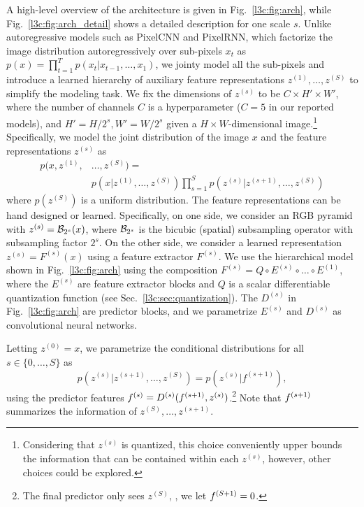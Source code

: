A high-level overview of the architecture is given in Fig.~\ref{l3c:fig:arch}, while Fig.~\ref{l3c:fig:arch_detail} shows a detailed description for one scale $s$.
Unlike autoregressive models such as PixelCNN and PixelRNN, which factorize the image distribution autoregressively over sub-pixels $x_t$ as $p(x) = \prod_{t=1}^T p(x_t|x_{t-1}, \ldots, x_1)$, we jointy model all the sub-pixels and introduce a learned hierarchy of auxiliary feature representations $z^{(1)}, \ldots, z^{(S)}$ to simplify the modeling task. We fix the dimensions of $z^{(s)}$ to be $C{\times}H'{\times}W'$, where the number of channels $C$ is a hyperparameter ($C=5$ in our reported models), and $H'=H/2^s, W'=W/2^s$ given a $H{\times}W$-dimensional image.\footnote{Considering that $z^{(s)}$ is quantized, this choice conveniently upper bounds the information that can be contained within each $z^{(s)}$, however, other choices could be explored.}
Specifically, we model the joint distribution of the image $x$ and the feature representations $z^{(s)}$ as
\begin{align*}
    p(x, z^{(1)}, &\ldots, z^{(S)}) = \\[-2ex]
    &p(x|z^{(1)}, \ldots, z^{(S)}) \prod_{s=1}^{S} p(z^{(s)}|z^{(s+1)}, \ldots, z^{(S)})
\end{align*}
where $p(z^{(S)})$ is a uniform distribution. The feature representations can be hand designed or learned. Specifically, on one side, we consider an RGB pyramid with $z^{(s)}=\mathcal{B}_{2^s}(x)$, where $\mathcal{B}_{2^s}$ is the bicubic (spatial) subsampling operator with subsampling factor $2^s$. On the other side, we consider a learned representation $z^{(s)}=F^{(s)}(x)$ using a feature extractor $F^{(s)}$. We use the hierarchical model shown in Fig.~\ref{l3c:fig:arch} using the composition 
$F^{(s)} = Q \circ E^{(s)} \circ \dots \circ E^{(1)}$,
where the $E^{(s)}$ are feature extractor blocks and $Q$ is a scalar differentiable quantization function (see Sec.~\ref{l3c:sec:quantization}). The $D^{(s)}$ in Fig.~\ref{l3c:fig:arch} are predictor blocks, and we parametrize $E^{(s)}$ and $D^{(s)}$ as convolutional neural networks. 

Letting $z^{(0)} = x$,
we parametrize the conditional distributions  
for all $s \in \{0, \dots, S \}$ as
\begin{equation*}
    p(z^{(s)}|z^{(s+1)}, \ldots, z^{(S)}) = p(z^{(s)}|f^{(s+1)}) \label{l3c:eq:p_cond_param},
\end{equation*}
using the predictor features
%
$    f^{(s)}=D^{(s)}(f^{(s+1)}, z^{(s)})$.\footnote{
            The final predictor only sees $z^{(S)}$, \ie, we let $f^{(S+1)} = 0$.}
%
Note that $f^{(s+1)}$ summarizes the information of $z^{(S)}, \dots, z^{(s+1)}$. 
%

